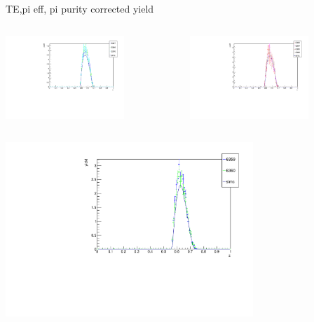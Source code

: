 \begin{frame}{TE,pi eff, pi purity corrected yield}
\begin{columns}
\begin{column}[T]{0.5\textwidth}
\includegraphics[width = 0.7\textwidth]{results/yield/check/yieldcheck_240_neg.pdf}
\end{column}
\begin{column}[T]{0.5\textwidth}
\includegraphics[width = 0.7\textwidth]{results/yield/check/yieldcheck_240_pos.pdf}
\end{column}
\end{columns}
\begin{columns}
\begin{column}[T]{0.5\textwidth}
\includegraphics[width = 0.7\textwidth]{results/yield/check/yieldcheck_230_neg.pdf}

\end{column}
\end{columns}
\end{frame}
